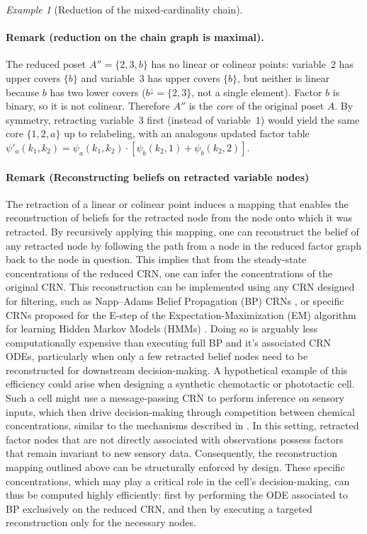 \documentclass{article}
\theoremstyle{plain}
\theoremstyle{definition}
\theoremstyle{remark}
\newtheorem{example}{Example}[section]
\newcommand{\<}{\langle}
\renewcommand{\>}{\rangle}
\begin{document}
\begin{example}[Reduction of the mixed-cardinality chain]
\paragraph{Remark (reduction on the chain graph is maximal).}
The reduced poset $A''=\{2,3,b\}$ has no linear or colinear points:
variable~$2$ has upper covers $\{b\}$ and variable~$3$ has upper covers
$\{b\}$, but neither is linear because $b$ has two lower covers
($b^{\downarrow}=\{2,3\}$, not a single element).
Factor $b$ is binary, so it is not colinear.
Therefore $A''$ is the \emph{core} of the original poset $A$.
By symmetry, retracting variable~$3$ first (instead of variable~$1$)
would yield the same core $\{1,2,a\}$ up to relabeling, with an
analogous updated factor table $\psi'_a(k_1,k_2)=
\psi_a(k_1,k_2)\cdot[\psi_b(k_2,1)+\psi_b(k_2,2)]$.

\paragraph{Remark (Reconstructing beliefs on retracted variable nodes)}
The retraction of a linear or colinear point induces a mapping that enables the reconstruction of beliefs for the retracted node from the node onto which it was retracted. By recursively applying this mapping, one can reconstruct the belief of any retracted node by following the path from a node in the reduced factor graph back to the node in question. This implies that from the steady-state concentrations of the reduced CRN, one can infer the concentrations of the original CRN. This reconstruction can be implemented using any CRN designed for filtering, such as Napp–Adams Belief Propagation (BP) CRNs \cite{NIPS2013_e5e63da7}, or specific CRNs proposed for the E-step of the Expectation-Maximization (EM) algorithm for learning Hidden Markov Models (HMMs) \cite{10.1098/rsif.2022.0877}. Doing so is arguably less computationally expensive than executing full BP and it's associated CRN ODEs, particularly when only a few retracted belief nodes need to be reconstructed for downstream decision-making. A hypothetical example of this efficiency could arise when designing a synthetic chemotactic or phototactic cell. Such a cell might use a message-passing CRN to perform inference on sensory inputs, which then drive decision-making through competition between chemical concentrations, similar to the mechanisms described in \cite{tang:hal-05576927}. In this setting, retracted factor nodes that are not directly associated with observations possess factors that remain invariant to new sensory data. Consequently, the reconstruction mapping outlined above can be structurally enforced by design. These specific concentrations, which may play a critical role in the cell's decision-making, can thus be computed highly efficiently: first by performing the ODE associated to BP exclusively on the reduced CRN, and then by executing a targeted reconstruction only for the necessary nodes.
\end{example}
\end{document}
